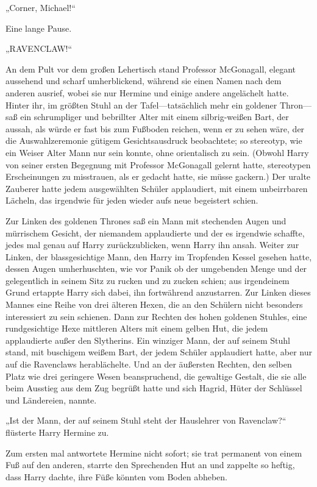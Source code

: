 {„Corner, Michael!“

Eine lange Pause.

„RAVENCLAW!“

An dem Pult vor dem großen Lehertisch stand Professor McGonagall, elegant aussehend und scharf umherblickend, während sie einen Namen nach dem anderen ausrief, wobei sie nur Hermine und einige andere angelächelt hatte. Hinter ihr, im größten Stuhl an der Tafel—tatsächlich mehr ein goldener Thron—saß ein schrumpliger und bebrillter Alter mit einem silbrig-weißen Bart, der aussah, als würde er fast bis zum Fußboden reichen, wenn er zu sehen wäre, der die Auswahlzeremonie gütigem Gesichtsausdruck beobachtete; so stereotyp, wie ein Weiser Alter Mann nur sein konnte, ohne orientalisch zu sein. (Obwohl Harry von seiner ersten Begegnung mit Professor McGonagall gelernt hatte, stereotypen Erscheinungen zu misstrauen, als er gedacht hatte, sie müsse gackern.) Der uralte Zauberer hatte jedem ausgewählten Schüler applaudiert, mit einem unbeirrbaren Lächeln, das irgendwie für jeden wieder aufs neue begeistert schien.

Zur Linken des goldenen Thrones saß ein Mann mit stechenden Augen und mürrischem Gesicht, der niemandem applaudierte und der es irgendwie schaffte, jedes mal genau auf Harry zurückzublicken, wenn Harry ihn ansah. Weiter zur Linken, der blassgesichtige Mann, den Harry im Tropfenden Kessel gesehen hatte, dessen Augen umherhuschten, wie vor Panik ob der umgebenden Menge und der gelegentlich in seinem Sitz zu rucken und zu zucken schien; aus irgendeinem Grund ertappte Harry sich dabei, ihn fortwährend anzustarren. Zur Linken dieses Mannes eine Reihe von drei älteren Hexen, die an den Schülern nicht besonders interessiert zu sein schienen. Dann zur Rechten des hohen goldenen Stuhles, eine rundgesichtige Hexe mittleren Alters mit einem gelben Hut, die jedem applaudierte außer den Slytherins. Ein winziger Mann, der auf seinem Stuhl stand, mit buschigem weißem Bart, der jedem Schüler applaudiert hatte, aber nur auf die Ravenclaws herablächelte. Und an der äußersten Rechten, den selben Platz wie drei geringere Wesen beanspruchend, die gewaltige Gestalt, die sie alle beim Ausstieg aus dem Zug begrüßt hatte und sich Hagrid, Hüter der Schlüssel und Ländereien, nannte.

„Ist der Mann, der auf seinem Stuhl steht der Hauslehrer von Ravenclaw?“ flüsterte Harry Hermine zu.

Zum ersten mal antwortete Hermine nicht sofort; sie trat permanent von einem Fuß auf den anderen, starrte den Sprechenden Hut an und zappelte so heftig, dass Harry dachte, ihre Füße könnten vom Boden abheben.

}
